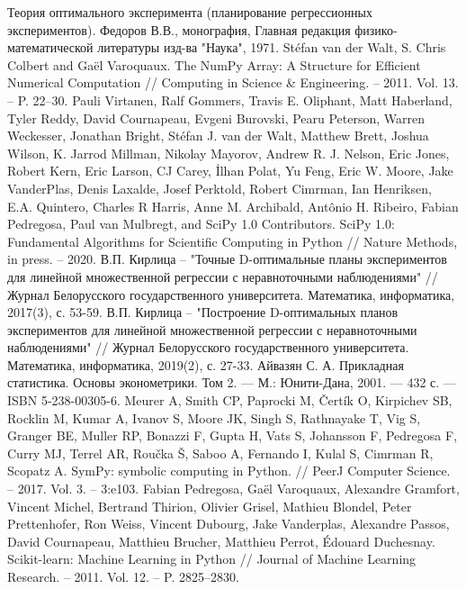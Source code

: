\begin{thebibliography}{}
	 Теория оптимального эксперимента (планирование регрессионных экспериментов). Федоров В.В., монография, Главная редакция физико-математической литературы изд-ва "Наука", 1971.
	 Stéfan van der Walt, S. Chris Colbert and Gaël Varoquaux. The NumPy Array: A Structure for Efficient Numerical Computation // Computing in Science \& Engineering. -- 2011. Vol. 13. -- P. 22--30.
	 Pauli Virtanen, Ralf Gommers, Travis E. Oliphant, Matt Haberland, Tyler Reddy, David Cournapeau, Evgeni Burovski, Pearu Peterson, Warren Weckesser, Jonathan Bright, Stéfan J. van der Walt, Matthew Brett, Joshua Wilson, K. Jarrod Millman, Nikolay Mayorov, Andrew R. J. Nelson, Eric Jones, Robert Kern, Eric Larson, CJ Carey, İlhan Polat, Yu Feng, Eric W. Moore, Jake VanderPlas, Denis Laxalde, Josef Perktold, Robert Cimrman, Ian Henriksen, E.A. Quintero, Charles R Harris, Anne M. Archibald, Antônio H. Ribeiro, Fabian Pedregosa, Paul van Mulbregt, and SciPy 1.0 Contributors.  SciPy 1.0: Fundamental Algorithms for Scientific Computing in Python // Nature Methods, in press. -- 2020.
	 В.П. Кирлица -- "Точные  D-оптимальные планы экспериментов для линейной множественной регрессии с неравноточными наблюдениями" // Журнал Белорусского государственного университета. Математика, информатика, 2017(3), с. 53-59.
	 В.П. Кирлица -- "Построение  D-оптимальных  планов экспериментов для линейной множественной регрессии с неравноточными наблюдениями" // Журнал Белорусского государственного университета. Математика, информатика, 2019(2), с. 27-33.
	 Айвазян С. А. Прикладная статистика. Основы эконометрики. Том 2. — М.: Юнити-Дана, 2001. — 432 с. — ISBN 5-238-00305-6.
	 Meurer A, Smith CP, Paprocki M, Čertík O, Kirpichev SB, Rocklin M, Kumar A, Ivanov S, Moore JK, Singh S, Rathnayake T, Vig S, Granger BE, Muller RP, Bonazzi F, Gupta H, Vats S, Johansson F, Pedregosa F, Curry MJ, Terrel AR, Roučka Š, Saboo A, Fernando I, Kulal S, Cimrman R, Scopatz A. SymPy: symbolic computing in Python. //  PeerJ Computer Science. -- 2017.  Vol. 3. -- 3:e103.
	 Fabian Pedregosa, Gaël Varoquaux, Alexandre Gramfort, Vincent Michel, Bertrand Thirion, Olivier Grisel, Mathieu Blondel, Peter Prettenhofer, Ron Weiss, Vincent Dubourg, Jake Vanderplas, Alexandre Passos, David Cournapeau, Matthieu Brucher, Matthieu Perrot, Édouard Duchesnay. Scikit-learn: Machine Learning in Python // Journal of Machine Learning Research. -- 2011. Vol. 12. -- P.  2825--2830.
\end{thebibliography}

